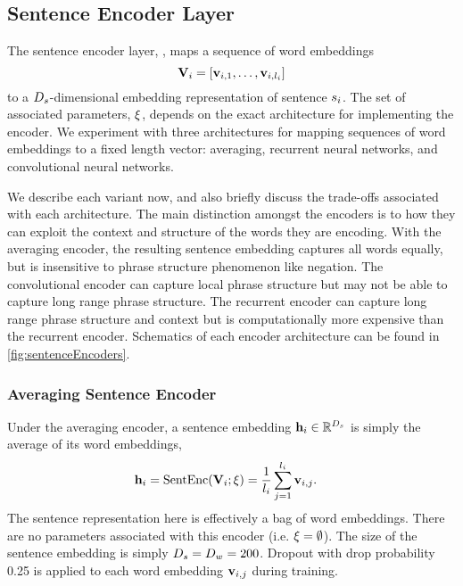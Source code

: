 

\subsection{Sentence Encoder Layer} \label{sec:senc}

The sentence encoder layer, \sentEncFuncDef, maps a sequence of word embeddings
\[
\mathbf{V}_i = \left[\mathbf{v}_{i,1},\ldots, \mathbf{v}_{i,l_i}\right]
\] 
to a $D_{s}$-dimensional embedding representation of sentence $s_i$.
The set of associated parameters, $\xi$, depends on the exact
architecture for implementing the encoder. We experiment with three
architectures for mapping sequences of word embeddings to a fixed length
vector: averaging, recurrent neural networks, and convolutional neural
networks.

We describe each variant now, and also briefly discuss the trade-offs
associated with each architecture. The main distinction amongst the encoders is
to how they can exploit the context and structure of the words they are
encoding. With the averaging encoder, the resulting sentence embedding captures
all words equally, but is insensitive to phrase structure phenomenon like
negation. The convolutional encoder can capture local phrase structure but may
not be able to capture long range phrase structure. The recurrent encoder can
capture long range phrase structure and context but is computationally more
expensive than the recurrent encoder.  Schematics of each encoder architecture
can be found in \autoref{fig:sentenceEncoders}.

\subsubsection{Averaging Sentence Encoder} 

Under the averaging encoder, a sentence embedding $\mathbf{h}_i \in
\mathbb{R}^{D_{s}}$ is simply the average of its word embeddings,
\begin{align} 
    \mathbf{h}_i & = \operatorname{SentEnc}(\mathbf{V}_i;\xi) =  
        \frac{1}{l_i} \sum_{j=1}^{l_i} \mathbf{v}_{i,j}.
\end{align}
The sentence representation here is effectively a bag of word embeddings.
There are no parameters associated with this encoder (i.e.  $\xi =
\emptyset$). The size of the sentence embedding is simply $D_{s} = D_{w} =
200$. Dropout with drop probability 0.25 is applied to each word embedding
$\mathbf{v}_{i,j}$ during training. 


